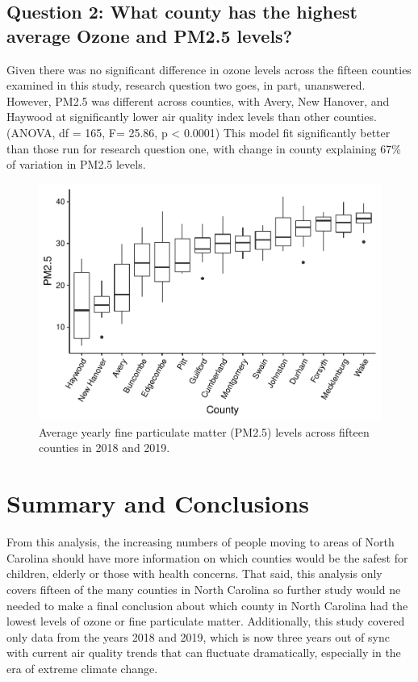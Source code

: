 \documentclass[
  12pt,
]{article}
\begin{document}
\hypertarget{question-2-what-county-has-the-highest-average-ozone-and-pm2.5-levels}{%
\subsection{Question 2: What county has the highest average Ozone and
PM2.5
levels?}\label{question-2-what-county-has-the-highest-average-ozone-and-pm2.5-levels}}

Given there was no significant difference in ozone levels across the
fifteen counties examined in this study, research question two goes, in
part, unanswered. However, PM2.5 was different across counties, with
Avery, New Hanover, and Haywood at significantly lower air quality index
levels than other counties. (ANOVA, df = 165, F= 25.86, p \textless{}
0.0001) This model fit significantly better than those run for research
question one, with change in county explaining 67\% of variation in
PM2.5 levels.

\begin{figure}
\centering
\includegraphics{Domeyer_FinalEDA_Sp22_files/figure-latex/results county-1.pdf}
\caption{Average yearly fine particulate matter (PM2.5) levels across
fifteen counties in 2018 and 2019.}
\end{figure}

\newpage

\hypertarget{summary-and-conclusions}{%
\section{Summary and Conclusions}\label{summary-and-conclusions}}

From this analysis, the increasing numbers of people moving to areas of
North Carolina should have more information on which counties would be
the safest for children, elderly or those with health concerns. That
said, this analysis only covers fifteen of the many counties in North
Carolina so further study would ne needed to make a final conclusion
about which county in North Carolina had the lowest levels of ozone or
fine particulate matter. Additionally, this study covered only data from
the years 2018 and 2019, which is now three years out of sync with
current air quality trends that can fluctuate dramatically, especially
in the era of extreme climate change.
\end{document}
